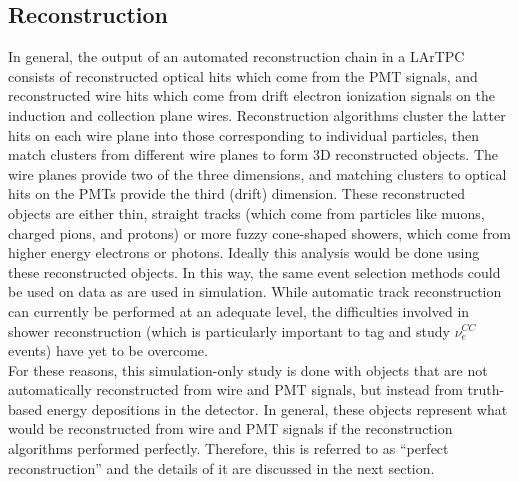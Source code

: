 \subsection{Reconstruction}
In general, the output of an automated reconstruction chain in a LArTPC consists of reconstructed optical hits which come from the PMT signals, and reconstructed wire hits which come from drift electron ionization signals on the induction and collection plane wires. Reconstruction algorithms cluster the latter hits on each wire plane into those corresponding to individual particles, then match clusters from different wire planes to form 3D reconstructed objects. The wire planes provide two of the three dimensions, and matching clusters to optical hits on the PMTs provide the third (drift) dimension. These reconstructed objects are either thin, straight tracks (which come from particles like muons, charged pions, and protons) or more fuzzy cone-shaped showers, which come from higher energy electrons or photons. Ideally this analysis would be done using these reconstructed objects. In this way, the same event selection  methods could be used on data as are used in simulation. While automatic track reconstruction can currently be performed at an adequate level, the difficulties involved in shower reconstruction (which is particularly important to tag and study $\nu_e^{CC}$ events) have yet to be overcome.\\

For these reasons, this simulation-only study is done with objects that are not automatically reconstructed from wire and PMT signals, but instead from truth-based energy depositions in the detector. In general, these objects represent what would be reconstructed from wire and PMT signals if the reconstruction algorithms performed perfectly. Therefore, this is referred to as ``perfect reconstruction'' and the details of it are discussed in the next section. 

